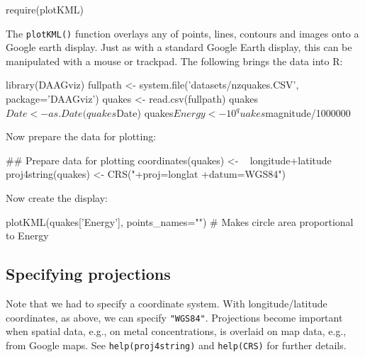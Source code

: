 \documentclass{tufte-book}\usepackage[]{graphicx}\usepackage[]{color}
\newcommand{\txtt}[1]{\texttt{#1}}
\begin{document}
\begin{Schunk}
\begin{Sinput}
require(plotKML)
\end{Sinput}
\end{Schunk}

The \txtt{plotKML()} function overlays any of points, lines, contours
and images onto a Google earth display.  Just as with a standard
Google Earth display, this can be manipulated with a mouse or
trackpad.  The following brings the data into R:
\begin{Schunk}
\begin{Sinput}
library(DAAGviz)
fullpath <- system.file('datasets/nzquakes.CSV',
                        package='DAAGviz')
quakes <- read.csv(fullpath)
quakes$Date <- as.Date(quakes$Date)
quakes$Energy <- 10^quakes$magnitude/1000000
\end{Sinput}
\end{Schunk}

Now prepare the data for plotting:
\begin{Schunk}
\begin{Sinput}
## Prepare data for plotting
coordinates(quakes) <- ~ longitude+latitude
proj4string(quakes) <-
  CRS("+proj=longlat +datum=WGS84")
\end{Sinput}
\end{Schunk}

Now create the display:
\begin{Schunk}
\begin{Sinput}
plotKML(quakes['Energy'], points_names="")
  # Makes circle area proportional to Energy
\end{Sinput}
\end{Schunk}

\subsection{Specifying projections}
Note that we had to specify a coordinate system.  With
longitude/latitude coordinates, as above, we can specify
\txtt{"WGS84"}. Projections become important when spatial data, e.g.,
on metal concentrations, is overlaid on map data, e.g., from Google
maps.  See \txtt{help(proj4string)} and \txtt{help(CRS)} for further
details.
\end{document}
